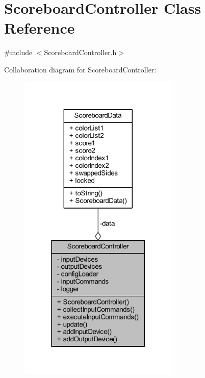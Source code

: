 \hypertarget{class_scoreboard_controller}{}\section{Scoreboard\+Controller Class Reference}
\label{class_scoreboard_controller}


{\ttfamily \#include $<$Scoreboard\+Controller.\+h$>$}



Collaboration diagram for Scoreboard\+Controller\+:
\nopagebreak
\begin{figure}[H]
\begin{center}
\leavevmode
\includegraphics[width=217pt]{class_scoreboard_controller__coll__graph}
\end{center}
\end{figure}
